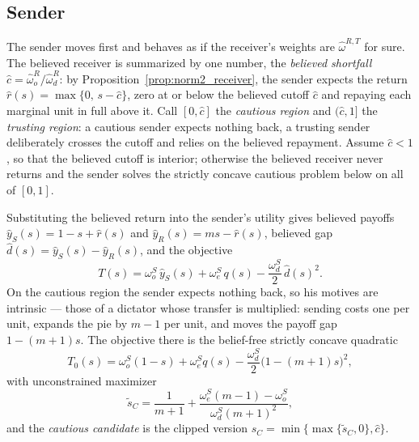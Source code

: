 \documentclass[11pt]{article}
\theoremstyle{plain}
\theoremstyle{remark}
\begin{document}
\subsection{Sender}

The sender moves first and behaves as if the receiver's weights are $\hat\omega^{R,T}$ for sure.  The believed receiver is summarized by one number, the \emph{believed shortfall} $\hat c=\hat\omega_o^{R}/\hat\omega_d^{R}$: by Proposition~\ref{prop:norm2_receiver}, the sender expects the return $\hat r(s)=\max\{0,\,s-\hat c\}$, zero at or below the believed cutoff $\hat c$ and repaying each marginal unit in full above it.  Call $[0,\hat c]$ the \emph{cautious region} and $(\hat c,1]$ the \emph{trusting region}: a cautious sender expects nothing back, a trusting sender deliberately crosses the cutoff and relies on the believed repayment.  Assume $\hat c<1$, so that the believed cutoff is interior; otherwise the believed receiver never returns and the sender solves the strictly concave cautious problem below on all of $[0,1]$.

Substituting the believed return into the sender's utility gives believed payoffs $\hat y_S(s)=1-s+\hat r(s)$ and $\hat y_R(s)=ms-\hat r(s)$, believed gap $\hat d(s)=\hat y_S(s)-\hat y_R(s)$, and the objective
\begin{equation}
\label{eq:norm2_T}
        T(s)
        =
        \omega_o^S\,\hat y_S(s)
        +\omega_e^S\,q(s)
        -\frac{\omega_d^S}{2}\,\hat d(s)^2 .
\end{equation}
On the cautious region the sender expects nothing back, so his motives are intrinsic --- those of a dictator whose transfer is multiplied: sending costs one per unit, expands the pie by $m-1$ per unit, and moves the payoff gap $1-(m+1)s$.  The objective there is the belief-free strictly concave quadratic
\[
        T_0(s)=\omega_o^S(1-s)+\omega_e^S q(s)-\frac{\omega_d^S}{2}\big(1-(m+1)s\big)^2,
\]
with unconstrained maximizer
\[
        \tilde s_C
        =
        \frac{1}{m+1}
        +\frac{\omega_e^S(m-1)-\omega_o^S}{\omega_d^S(m+1)^2},
\]
and the \emph{cautious candidate} is the clipped version $s_C=\min\{\max\{\tilde s_C,0\},\hat c\}$.
\end{document}
